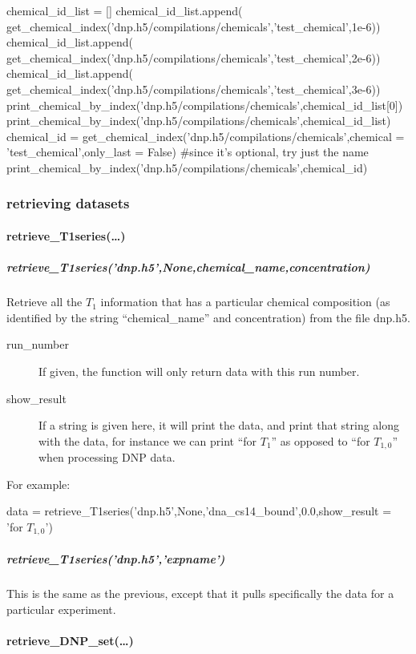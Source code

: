 \begin{python}
chemical_id_list = []
chemical_id_list.append(
    get_chemical_index('dnp.h5/compilations/chemicals','test_chemical',1e-6))
chemical_id_list.append(
    get_chemical_index('dnp.h5/compilations/chemicals','test_chemical',2e-6))
chemical_id_list.append(
    get_chemical_index('dnp.h5/compilations/chemicals','test_chemical',3e-6))
print_chemical_by_index('dnp.h5/compilations/chemicals',chemical_id_list[0])
print_chemical_by_index('dnp.h5/compilations/chemicals',chemical_id_list)
chemical_id = get_chemical_index('dnp.h5/compilations/chemicals',chemical = 'test_chemical',only_last = False) #since it's optional, try just the name
print_chemical_by_index('dnp.h5/compilations/chemicals',chemical_id)
\end{python}
\subsubsection{retrieving datasets}
\paragraph{retrieve\_T1series(\ldots)}
\subparagraph{retrieve\_T1series('dnp.h5',None,chemical\_name,concentration)}
Retrieve all the $T_1$ information that has a particular chemical
    composition (as identified by the string ``chemical\_name''
    and concentration) from the file dnp.h5.

\begin{description}
    \item[run\_number] If given, the function will only return
        data with this run number.
    \item[show\_result] If a string is given here, it will print
        the data, and print that string along with the data, for
        instance we can print ``for $T_1$'' as opposed to ``for
        $T_{1,0}$'' when processing DNP data.
\end{description}

For example:

\begin{python}
data = retrieve_T1series('dnp.h5',None,'dna_cs14_bound',0.0,show_result
= 'for $T_{1,0}$')
\end{python}

\subparagraph{retrieve\_T1series('dnp.h5','expname')}
This is the same as the previous, except that it pulls
    specifically the data for a particular experiment.
\paragraph{retrieve\_DNP\_set(\ldots)}

